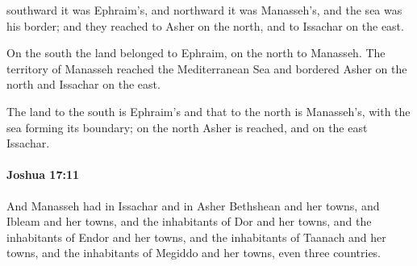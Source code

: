 			\begin{versebox}
					\item[BHS] 
					\item[ASV] southward it was Ephraim's, and northward it was Manasseh's, and the sea was his border; and they reached to Asher on the north, and to Issachar on the east.
					\item[NIV] On the south the land belonged to Ephraim, on the north to Manasseh. The territory of Manasseh reached the Mediterranean Sea and bordered Asher on the north and Issachar on the east.
					\item[NRSV] The land to the south is Ephraim’s and that to the north is Manasseh’s, with the sea forming its boundary; on the north Asher is reached, and on the east Issachar.
			\end{versebox}

		\paragraph{Joshua 17:11} %
			\label{JOSHUA-17-11}

			And Manasseh had in Issachar and in Asher Bethshean and her towns, and Ibleam and her towns, and the inhabitants of Dor and her towns, and the inhabitants of Endor and her towns, and the inhabitants of Taanach and her towns, and the inhabitants of Megiddo and her towns, even three countries.

